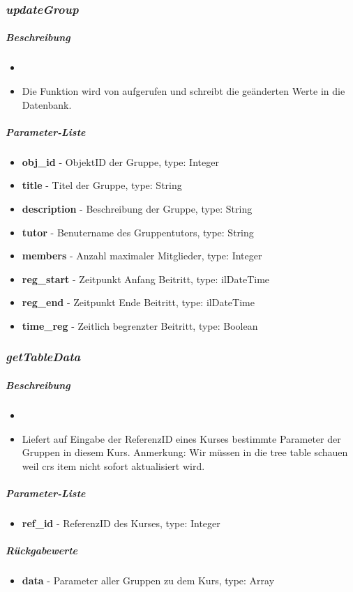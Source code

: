 \subsubsection*{\textit{updateGroup}}\label{updateGroupGDGUI}
\subparagraph{Beschreibung}
\begin{itemize}
	\item[]  \noindent{} 
	\item[] Die Funktion wird von  aufgerufen und schreibt die geänderten Werte in die Datenbank.
\end{itemize}
\subparagraph{Parameter-Liste}
\begin{itemize}
	\item[] \textbf{obj\_id} - ObjektID der Gruppe, type: Integer
	\item[] \textbf{title} - Titel der Gruppe, type: String
	\item[] \textbf{description} - Beschreibung der Gruppe, type: String
	\item[] \textbf{tutor} - Benutername des Gruppentutors, type: String
	\item[] \textbf{members} - Anzahl maximaler Mitglieder, type: Integer
	\item[] \textbf{reg\_start} - Zeitpunkt Anfang Beitritt, type: ilDateTime
	\item[] \textbf{reg\_end} - Zeitpunkt Ende Beitritt, type: ilDateTime
	\item[] \textbf{time\_reg} - Zeitlich begrenzter Beitritt, type: Boolean
\end{itemize}

\subsubsection*{\textit{getTableData}}\label{getTableDataGDGUI}
\subparagraph{Beschreibung}
\begin{itemize}
	\item[] \noindent{}
	\item[] Liefert auf Eingabe der ReferenzID eines Kurses bestimmte Parameter der Gruppen in diesem Kurs. Anmerkung: Wir müssen in die tree table schauen weil crs item nicht sofort aktualisiert wird.
\end{itemize}
\subparagraph{Parameter-Liste}
\begin{itemize}
	\item[] \textbf{ref\_id} - ReferenzID des Kurses, type: Integer
\end{itemize}
\subparagraph{Rückgabewerte}
\begin{itemize}
	\item[] \textbf{data} - Parameter aller Gruppen zu dem Kurs, type: Array
\end{itemize}

